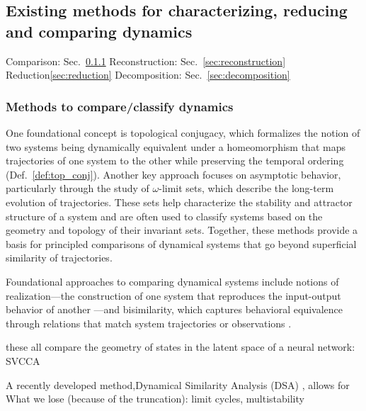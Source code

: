\documentclass{article}
\theoremstyle{definition} \newtheorem{definition}{Definition}  \newtheorem{example}{Example}
\theoremstyle{remark} \newtheorem{remark}{Remark}
\newcounter{ct}
\begin{document}
\subsection{Existing methods for characterizing, reducing and comparing dynamics}\label{sec:sota_methods}
Comparison: Sec.~\ref{sec:comparison}
Reconstruction: Sec.~\ref{sec:reconstruction}
Reduction\ref{sec:reduction}
Decomposition: Sec.~\ref{sec:decomposition}


\subsubsection{Methods to compare/classify dynamics}\label{sec:comparison}
One foundational concept is topological conjugacy, which formalizes the notion of two systems being dynamically equivalent under a homeomorphism that maps trajectories of one system to the other while preserving the temporal ordering (Def.~\ref{def:top_conj}).
Another key approach focuses on asymptotic behavior, particularly through the study of $\omega$-limit sets, which describe the long-term evolution of trajectories.
These sets help characterize the stability and attractor structure of a system and are often used to classify systems based on the geometry and topology of their invariant sets.
Together, these methods provide a basis for principled comparisons of dynamical systems that go beyond superficial similarity of trajectories.

Foundational approaches to comparing dynamical systems include notions of realization—the construction of one system that reproduces the input-output behavior of another \citep{grigoryeva2020dimension, gonon2023approximation}—and bisimilarity, which captures behavioral equivalence through relations that match system trajectories or observations \citep{vanderschaft2004bisimulation, vanderschaft2004equivalence, pola2004bisimulation, pola2006equivalence, tabuada2004bisimilar,girard2011approximate}.

these all compare the geometry of states in the latent space of a neural network:
\citep{kriegeskorte2008representational}
SVCCA\citep{raghu2017svcca}
\citep{barbosa2025quantifying} %


A recently developed method,Dynamical Similarity Analysis (DSA) \citep{ostrow2024beyond}, %
allows for 
What we lose (because of the truncation): limit cycles, multistability
\end{document}
